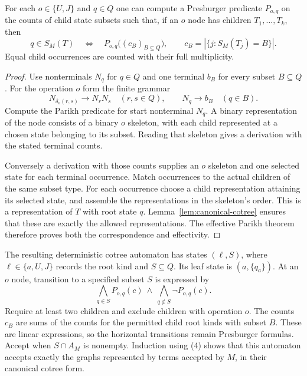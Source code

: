 \begin{lemma}\label{lem:parikh-transition}
For each $o\in\{U,J\}$ and $q\in Q$ one can compute a Presburger
predicate $P_{o,q}$ on the counts of child state subsets such that, if
an $o$ node has children $T_1,\ldots,T_k$, then
\[
 q\in S_M(T)\quad\Longleftrightarrow\quad
 P_{o,q}\bigl((c_B)_{B\subseteq Q}\bigr),\qquad
 c_B=|\{j:S_M(T_j)=B\}|.                                   \tag{4}
\]
Equal child occurrences are counted with their full multiplicity.
\end{lemma}
\begin{proof}
Use nonterminals $N_q$ for $q\in Q$ and one terminal $b_B$ for every
subset $B\subseteq Q$. For the operation $o$ form the finite grammar
\[
 N_{\delta_o(r,s)}\longrightarrow N_rN_s\quad(r,s\in Q),
 \qquad N_q\longrightarrow b_B\quad(q\in B).
\]
Compute the Parikh predicate for start nonterminal $N_q$. A binary
representation of the node consists of a binary $o$ skeleton, with each
child represented at a chosen state belonging to its subset. Reading
that skeleton gives a derivation with the stated terminal counts.

Conversely a derivation with those counts supplies an $o$ skeleton and
one selected state for each terminal occurrence. Match occurrences to
the actual children of the same subset type. For each occurrence choose
a child representation attaining its selected state, and assemble the
representations in the skeleton's order. This is a representation of
$T$ with root state $q$. Lemma~\ref{lem:canonical-cotree} ensures that
these are exactly the allowed representations. The effective Parikh
theorem therefore proves both the correspondence and effectivity.
\end{proof}

The resulting deterministic cotree automaton has states $(\ell,S)$,
where $\ell\in\{a,U,J\}$ records the root kind and $S\subseteq Q$.
Its leaf state is $(a,\{q_a\})$. At an $o$ node, transition to a
specified subset $S$ is expressed by
\[
 \bigwedge_{q\in S}P_{o,q}(c)\ \land\
 \bigwedge_{q\notin S}\neg P_{o,q}(c).                        \tag{5}
\]
Require at least two children and exclude children with operation $o$.
The counts $c_B$ are sums of the counts for the permitted child root
kinds with subset $B$. These are linear expressions, so the horizontal
transitions remain Presburger formulas. Accept when $S\cap A_M$ is
nonempty. Induction using (4) shows that this automaton accepts exactly
the graphs represented by terms accepted by $M$, in their canonical
cotree form.

